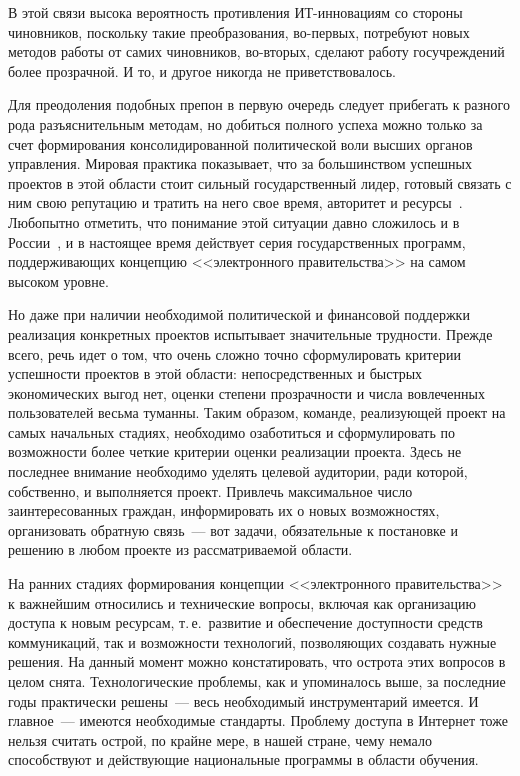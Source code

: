 \begin{multicols}{2}
В этой связи высока вероятность противления ИТ-ин\-но\-ва\-ци\-ям со стороны чиновников,
поскольку такие преобразования, во-первых, потребуют новых методов работы от самих
чиновников, во-вторых, сделают работу госучреждений более прозрачной. И то, и другое
никогда не приветствовалось.

Для преодоления подобных препон в первую очередь следует прибегать к разного рода
разъяснительным методам, но добиться полного успеха можно только за счет
формирования консолидированной политической воли высших органов управ\-ле\-ния.
Мировая практика показывает, что за большинством успешных проектов в этой области
стоит сильный государственный лидер, готовый связать с ним свою репутацию и тратить
на него свое время, авторитет и ресурсы~\cite{2bos}. Любопытно отметить, что понимание
этой ситуации давно сложилось и в России~\cite{4bos, 5bos}, и в настоящее время
действует серия государственных программ, поддерживающих концепцию
<<электронного правительства>> на самом высоком уровне.

Но даже при наличии необходимой политической и финансовой поддержки реализация
конкретных проектов испытывает значительные трудности. Прежде всего, речь идет о
том, что очень сложно точно сформулировать критерии ус\-пеш\-ности проектов в этой
области: непосредственных и быстрых экономических выгод нет, оценки степени
прозрачности и числа вовлеченных пользователей весьма туманны. Таким образом,
команде, реализующей проект на самых начальных стадиях, необходимо озаботиться и
сформулировать по возможности более четкие критерии оценки реализации проекта.
Здесь не последнее внимание необходимо уделять целевой аудитории, ради которой,
собственно, и выполняется проект. Привлечь максимальное число заинтересованных
граж\-дан, информировать их о новых возможностях, организовать обратную связь~--- вот
задачи, обязательные к постановке и решению в любом проекте из рас\-смат\-ри\-ва\-емой
области.

На ранних стадиях формирования концепции <<электронного правительства>> к
важнейшим относились и технические вопросы, включая как организацию доступа к
новым ресурсам, т.\,е.\ развитие и обеспечение доступности средств коммуникаций, так и
возможности технологий, позволяющих создавать нужные решения. На данный момент
можно констатировать, что острота этих вопросов в целом снята. Технологические
проблемы, как и упоминалось выше, за последние годы практически решены~--- весь
необходимый инструментарий имеется. И главное~--- имеются необходимые стандарты.
Проблему доступа в Интернет тоже нельзя считать острой, по крайне мере, в нашей
стране, чему немало способствуют и действующие национальные программы в области
обучения.


\end{multicols}
